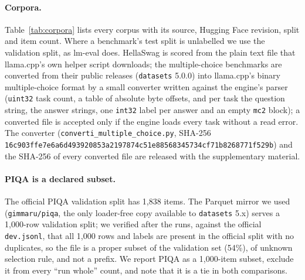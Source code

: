 \documentclass[10pt]{article} %
\begin{document}
\paragraph{Corpora.} Table~\ref{tab:corpora} lists every corpus with its
source, Hugging Face revision, split and item count. Where a benchmark's test
split is unlabelled we use the validation split, as lm-eval does. HellaSwag is
scored from the plain text file that llama.cpp's own helper script downloads;
the multiple-choice benchmarks are converted from their public releases
(\texttt{datasets} 5.0.0) into llama.cpp's binary multiple-choice format by a
small converter written against the engine's parser (\texttt{uint32} task
count, a table of absolute byte offsets, and per task the question string, the
answer strings, one \texttt{int32} label per answer and an empty \texttt{mc2}
block); a converted file is accepted only if the engine loads every task
without a read error. The converter (\texttt{converti\_multiple\_choice.py}, SHA-256
\texttt{16c903ffe7e6a6d493920853a2197874c51e88568345734cf71b8268771f529b}) and
the SHA-256 of every converted file are released with the supplementary
material.

\paragraph{PIQA is a declared subset.} The official PIQA validation split has
1,838 items. The Parquet mirror we used (\texttt{gimmaru/piqa}, the only
loader-free copy available to \texttt{datasets} 5.x) serves a 1,000-row
validation split; we verified after the runs, against the official
\texttt{dev.jsonl}, that all 1,000 rows and labels are present in the
official split with no duplicates, so the file is a proper subset of the
validation set (54\%), of unknown selection rule, and not a prefix. We report
PIQA as a 1,000-item subset, exclude it from every ``run whole'' count, and
note that it is a tie in both comparisons.
\end{document}
